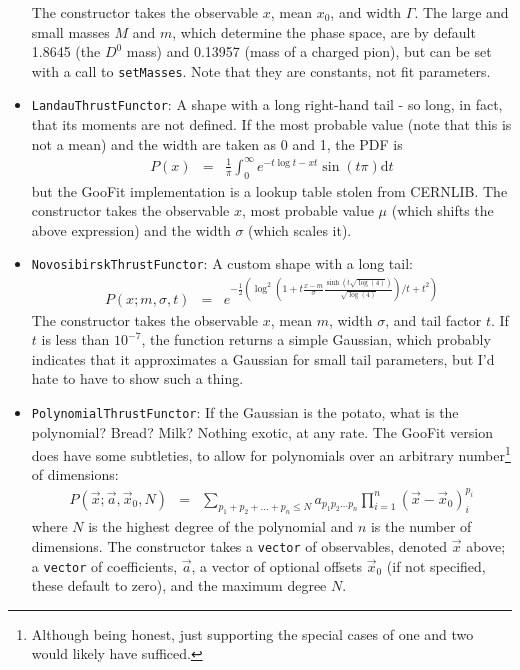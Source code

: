 \documentclass[12pt,pdflatex]{article}
\begin{document}
\begin{itemize}
The constructor takes the observable $x$, mean $x_0$, and width $\Gamma$. The
large and small masses $M$ and $m$, which determine the phase space, are by default
1.8645 (the $D^0$ mass) and 0.13957 (mass of a charged pion), but can be set with
a call to \texttt{setMasses}. Note that they are constants, not fit parameters. 
\item \texttt{LandauThrustFunctor}: A shape with a long right-hand tail - so long, in
fact, that its moments are not defined. If the most probable value (note that this is not
a mean) and the width are taken as 0 and 1, the PDF is
\begin{eqnarray}
P(x) &=& \frac{1}{\pi}\int_0^\infty e^{-t\log t - xt}\sin(t\pi)\mathrm{d}t
\end{eqnarray}
but the GooFit implementation
is a lookup table stolen from CERNLIB. 
The constructor takes the observable $x$, most probable value $\mu$
(which shifts the above expression) and the width $\sigma$ (which scales it). 
\item \texttt{NovosibirskThrustFunctor}: A custom shape with a long tail:
\begin{eqnarray}
P(x;m,\sigma,t) &=& 
e^{-\frac{1}{2}\left(\log^2(1+t\frac{x-m}{\sigma}\frac{\sinh(t\sqrt{\log(4)})}{\sqrt{\log(4)}})/t + t^2\right)}
\end{eqnarray}
The constructor takes the observable $x$, mean $m$, width $\sigma$, 
and tail factor $t$. If $t$ is less than $10^{-7}$, the function
returns a simple Gaussian, which probably indicates that it approximates
a Gaussian for small tail parameters, but I'd hate to have to show such
a thing. 
\item \texttt{PolynomialThrustFunctor}: If the Gaussian is the potato,
what is the polynomial? Bread? Milk? Nothing exotic, at any rate. 
The GooFit version does have some subtleties, to allow for polynomials
over an arbitrary number\footnote{Although being honest,
just supporting the special cases of one and two would likely have sufficed.}
 of dimensions:
\begin{eqnarray}
P(\vec x; \vec a, \vec x_0, N) &=&
\sum\limits_{p_1+p_2+\ldots+p_n \le N} a_{p_1p_2\ldots p_n} \prod\limits_{i=1}^n (\vec x - \vec x_0)_i^{p_i}
\end{eqnarray}
where $N$ is the highest degree of the polynomial and $n$ is the number of dimensions.
The constructor takes a \texttt{vector} of observables, denoted $\vec x$ above;
a \texttt{vector} of coefficients, $\vec a$, a vector of optional offsets $\vec x_0$
(if not specified, these default to zero), and the maximum degree $N$. 

\end{itemize}
\end{document}
